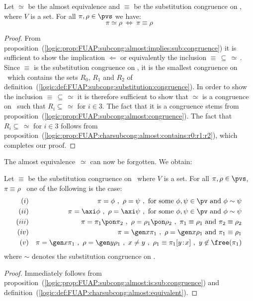 \begin{prop}\label{logic:prop:FUAP:subcong:almost:is:sub:congruence}
Let $\simeq$ be the almost equivalence and $\equiv$ be the
substitution congruence on \pvs, where $V$ is a set. For all
$\pi,\rho\in\pvs$ we have:
    \[
    \pi\simeq\rho\ \Leftrightarrow\ \pi\equiv\rho
    \]
\end{prop}
\begin{proof}
From
proposition~(\ref{logic:prop:FUAP:subcong:almost:implies:sub:congruence})
it is sufficient to show the implication $\Leftarrow$ or
equivalently the inclusion $\equiv\,\subseteq\,\simeq\,$. Since
$\equiv$ is the substitution congruence on \pvs, it is the smallest
congruence on \pvs\ which contains the sets $R_{0}$, $R_{1}$ and
$R_{2}$ of
definition~(\ref{logic:def:FUAP:subcong:substitution:congruence}).
In order to show the inclusion $\equiv\,\subseteq\,\simeq$ it is
therefore sufficient to show that $\simeq$ is a congruence on \pvs\
such that $R_{i}\subseteq\,\simeq$ for $i\in 3$. The fact that it is
a congruence stems from
proposition~(\ref{logic:prop:FUAP:subcong:almost:congruence}). The
fact that $R_{i}\subseteq\,\simeq$ for $i\in 3$  follows from
proposition~(\ref{logic:prop:FUAP:charsubcong:almost:contains:r0:r1:r2}),
which completes our proof.
\end{proof}

The almost equivalence~$\simeq$ can now be forgotten. We obtain:

\begin{theorem}\label{logic:the:FUAP:charsubcong:charac}
Let $\equiv$ be the substitution congruence on \pvs\ where $V$ is a
set. For all $\pi,\rho\in\pvs$, $\pi\equiv\rho$ \ifand\ one of the
following is the case:
    \begin{eqnarray*}
    (i)&&\pi=\phi\ ,\ \rho=\psi\ ,\ \mbox{for some}\ \phi,\psi\in\pv\ \mbox{and}\ \phi\sim\psi\\
    (ii)&&\pi=\axi\phi\ ,\ \rho=\axi\psi\ ,\ \mbox{for some}\ \phi,\psi\in\pv\ \mbox{and}\ \phi\sim\psi\\
    (iii)&&\pi=\pi_{1}\pon\pi_{2}\ ,\ \rho=\rho_{1}\pon\rho_{2}\ ,\
    \pi_{1}\equiv\rho_{1}\ \mbox{and}\ \pi_{2}\equiv\rho_{2}\\
    (iv)&&\pi=\gen x\pi_{1}\ ,\ \rho=\gen x\rho_{1}\ \mbox{and}\ \pi_{1}\equiv\rho_{1}\\
    (v)&&\pi=\gen x\pi_{1}\ ,\ \rho=\gen y\rho_{1}\ ,\ x\neq y\ ,\
    \rho_{1}\equiv \pi_{1}[y\!:\!x]\ ,\ y\not\in\free(\pi_{1})
    \end{eqnarray*}
where $\sim$ denotes the substitution congruence on \pv.
\end{theorem}
\begin{proof}
Immediately follows from
proposition~(\ref{logic:prop:FUAP:subcong:almost:is:sub:congruence})
and definition~(\ref{logic:def:FUAP:charsubcong:almost:equivalent}).
\end{proof}

